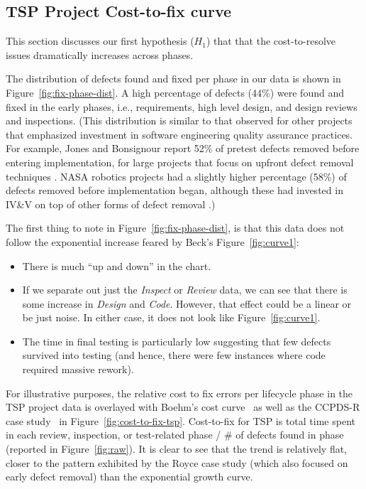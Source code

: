 \documentclass{sig-alternate}
\newcommand{\bi}{\begin{itemize}}%
\newcommand{\ei}{\end{itemize}}
\newcommand{\fig}[1]{Figure~\ref{fig:#1}}
\begin{document}
\subsection{TSP Project Cost-to-fix curve}
This section discusses our first hypothesis ($H_1$) that   that  the cost-to-resolve issues dramatically increases across phases.

The distribution of defects found and fixed per phase in our data is shown in Figure~\ref{fig:fix-phase-dist}. A high percentage of defects (44\%) were found and fixed in the early phases, i.e., requirements, high level design, and design reviews and inspections. (This distribution is similar to that observed for other projects that emphasized investment in software engineering quality assurance practices. For example, Jones and Bonsignour report 52\% of pretest defects removed before entering implementation, for large projects that focus on upfront defect removal techniques \cite{jones12}. NASA robotics projects had a slightly higher percentage (58\%) of defects removed before implementation began, although these had invested in IV\&V on top of other forms of defect removal \cite{me08a}.)  

The first thing to note in Figure~\ref{fig:fix-phase-dist}, 
is that this data does not follow the exponential increase feared by Beck's \fig{curve1}:
\bi
\item There is much ``up and down'' in the chart. 
\item If we separate out just the {\em Inspect} or {\em Review} data, we can see that there is some increase in {\em Design} and {\em Code}. However, that effect could be a linear or be just noise. In either case,
it does not look like \fig{curve1}.
\item The time in final testing is particularly low suggesting that few defects survived into testing
(and hence, there were few instances where code required massive rework).
\ei

For illustrative purposes, the relative cost to fix errors per lifecycle phase in the TSP project data is overlayed with Boehm's cost curve~\cite{Boehm81} as well as the CCPDS-R case study~\cite{Royce98} in \fig{cost-to-fix-tsp}. Cost-to-fix for TSP is total time spent in each review, inspection, or test-related phase / \# of defects found in phase (reported in \fig{raw}). It is clear to see that the trend is relatively flat, closer to the pattern exhibited by the Royce case study (which also focused on early defect removal) than the exponential growth curve.
\end{document}
